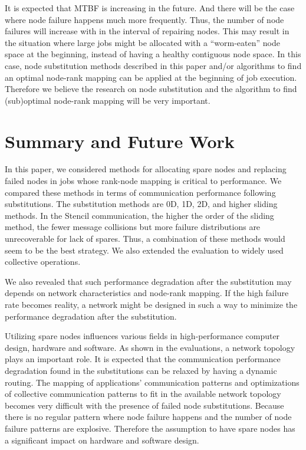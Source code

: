 \documentclass[Afour,times,sageh]{sagej}
\begin{document}
It is expected that MTBF is increasing in the future. And there will
be the case where node failure happens much more frequently. Thus, the
number of node failures will increase with in the interval of
repairing nodes. This may result in the situation where large jobs
might be allocated with a ``worm-eaten'' node space at the beginning,
instead of having a healthy contiguous node space. In this case, node
substitution methods described in this paper and/or algorithms to find
an optimal node-rank mapping can be applied at the beginning of job
execution. Therefore we believe the research on node substitution and
the algorithm to find (sub)optimal node-rank mapping will be very
important.

\section{Summary and Future Work}

In this paper, we considered methods for allocating spare nodes and
replacing failed nodes in jobs whose rank-node mapping is critical to
performance. We compared these methods in terms of
communication performance following substitutions. The substitution
methods are 0D, 1D, 2D, and higher sliding methods. In the Stencil
communication, the higher the order of the sliding method, the fewer
message collisions but more failure distributions are unrecoverable
for lack of spares. Thus, a combination of these methods would seem
to be the best strategy. We also extended the evaluation to widely
used collective operations.

We also revealed that such performance degradation after the
substitution may depends on network characteristics and node-rank
mapping. If the high failure rate becomes reality, a network might be
designed in such a way to minimize the performance degradation after
the substitution.

Utilizing spare nodes influences various fields in high-performance
computer design, hardware and software. As shown in the evaluations,
a network topology plays an important role. It is expected that the
communication performance degradation found in the substitutions can
be relaxed by having a dynamic routing. The mapping of applications'
communication patterns and optimizations of collective
communication patterns to fit in the available network topology becomes
very difficult with the presence of failed node substitutions. Because
there is no regular pattern where node failure happens and the
number of node failure patterns are explosive. Therefore the
assumption to have spare nodes has a significant impact on hardware
and software design.
\end{document}
